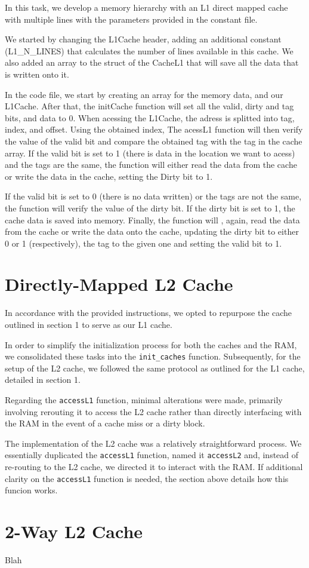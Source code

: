 \documentclass[12pt]{article}
\begin{document}
    In this task, we develop a memory hierarchy with an L1 direct mapped cache with multiple lines with the parameters provided in the constant file.
    
    We started by changing the L1Cache header, adding an additional constant (L1\_N\_LINES) that calculates the number of lines available in this cache.
     We also added an array to the struct of the CacheL1 that will save all the data that is written onto it.

    In the code file, we start by creating an array for the memory data, and our L1Cache. After that, the initCache function
     will set all the valid, dirty and tag bits, and data to 0. When acessing the L1Cache, the adress is splitted into tag, index, and offset.
     Using the obtained index, The acessL1 function will then verify the value of the valid bit and compare the obtained tag with the tag 
     in the cache array. If the valid bit is set to 1 (there is data in the location we want to acess) and the tags are the same, the function 
     will either read the data from the cache or write the data in the cache, setting the Dirty bit to 1. 

    If the valid bit is set to 0 (there is no data written) or the tags are not the same, the function will verify the
     value of the dirty bit. If the dirty bit is set to 1, the cache data is saved into memory. Finally, the function will , again,
     read the data from the cache or write the data onto the cache, updating the dirty bit to either 0 or 1 (respectively), the tag to the given one
     and setting the valid bit to 1.

    \section{Directly-Mapped L2 Cache}

    In accordance with the provided instructions, we opted to repurpose the cache outlined in section 1 to serve as our L1 cache.

    In order to simplify the initialization process for both the caches and the RAM, we consolidated these tasks into the \texttt{init\_caches} 
     function. Subsequently, for the setup of the L2 cache, we followed the same protocol as outlined for the L1 cache, detailed in section 1.

    Regarding the \texttt{accessL1} function, minimal alterations were made, primarily involving rerouting it to access the L2 cache rather than directly
     interfacing with the RAM in the event of a cache miss or a dirty block.

    The implementation of the L2 cache was a relatively straightforward process. We essentially duplicated the \texttt{accessL1} function, named it \texttt{accessL2} and,
     instead of re-routing to the L2 cache, we directed it to interact with the RAM. If additional clarity on the \texttt{accessL1} function is needed, the section above 
     details how this funcion works.


    \section{2-Way L2 Cache}

    Blah
\end{document}
